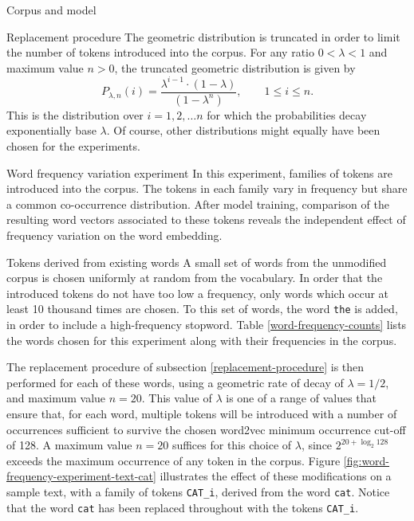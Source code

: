 \documentclass{article} %
\newcommand{\word}[1]{\texttt{#1}}
\begin{document}
\begin{section}{Corpus and model}
\begin{subsection}{Replacement procedure}
The geometric distribution is truncated in order to limit the number of tokens introduced into the corpus.
For any ratio $0 < \lambda < 1$ and maximum value $n > 0$, the truncated geometric distribution is given by
$$ P_{\lambda, n} (i) = \frac{\lambda^{i-1} \cdot (1-\lambda)}{(1 - \lambda^n)}, \qquad 1 \leqslant i \leqslant n.$$ 
This is the distribution over $i = 1, 2, \dots n$ for which the probabilities decay exponentially base $\lambda$.
Of course, other distributions might equally have been chosen for the experiments.
\end{subsection}
\end{section}

\begin{section}{Word frequency variation experiment}\label{WFVE}
In this experiment, families of tokens are introduced into the corpus.
The tokens in each family vary in frequency but share a common co-occurrence distribution.
After model training, comparison of the resulting word vectors associated to these tokens reveals the independent effect of frequency variation on the word embedding.

\begin{subsection}{Tokens derived from existing words}\label{WFVEexisting}
A small set of words from the unmodified corpus is chosen uniformly at random from the vocabulary.
In order that the introduced tokens do not have too low a frequency, only words which occur at least 10 thousand times are chosen.
To this set of words, the word \word{the} is added, in order to include a high-frequency stopword.
Table \ref{word-frequency-counts} lists the words chosen for this experiment along with their frequencies in the corpus.

The replacement procedure of subsection \ref{replacement-procedure} is then performed for each of these words, using a geometric rate of decay of $\lambda = 1/2$, and maximum value $n=20$.
This value of $\lambda$ is one of a range of values that ensure that, for each word, multiple tokens will be introduced with a number of occurrences sufficient to survive the chosen word2vec minimum occurrence cut-off of 128.  
A maximum value $n=20$ suffices for this choice of $\lambda$, since $2^{20 + \log_2{128}}$ exceeds the maximum occurrence of any token in the corpus. 
Figure \ref{fig:word-frequency-experiment-text-cat} illustrates the effect of these modifications on a sample text, with a family of tokens \word{CAT\_i}, derived from the word \word{cat}.
Notice that the word \word{cat} has been replaced throughout with the tokens \word{CAT\_i}.


\end{subsection}
\end{section}
\end{document}
